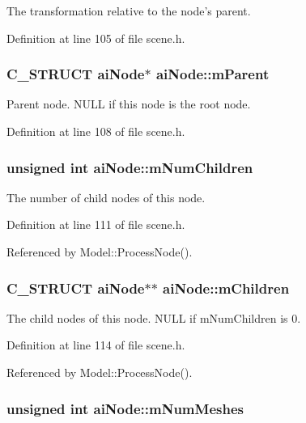 The transformation relative to the node's parent. 

Definition at line 105 of file scene.h.\hypertarget{structai_node_a6896b42c78e784db85d822a4c8dd404}{
\subsubsection[mParent]{\setlength{\rightskip}{0pt plus 5cm}C\_\-STRUCT {\bf aiNode}$\ast$ {\bf aiNode::mParent}}}
\label{structai_node_a6896b42c78e784db85d822a4c8dd404}


Parent node. NULL if this node is the root node. 

Definition at line 108 of file scene.h.\hypertarget{structai_node_f5030494b156ec54632e6182a6e386ca}{
\subsubsection[mNumChildren]{\setlength{\rightskip}{0pt plus 5cm}unsigned int {\bf aiNode::mNumChildren}}}
\label{structai_node_f5030494b156ec54632e6182a6e386ca}


The number of child nodes of this node. 

Definition at line 111 of file scene.h.

Referenced by Model::ProcessNode().\hypertarget{structai_node_c700679f0d4971f124e8444f68057291}{
\subsubsection[mChildren]{\setlength{\rightskip}{0pt plus 5cm}C\_\-STRUCT {\bf aiNode}$\ast$$\ast$ {\bf aiNode::mChildren}}}
\label{structai_node_c700679f0d4971f124e8444f68057291}


The child nodes of this node. NULL if mNumChildren is 0. 

Definition at line 114 of file scene.h.

Referenced by Model::ProcessNode().\hypertarget{structai_node_7a411079096f86d1e96b6368d237d897}{
\subsubsection[mNumMeshes]{\setlength{\rightskip}{0pt plus 5cm}unsigned int {\bf aiNode::mNumMeshes}}}
\label{structai_node_7a411079096f86d1e96b6368d237d897}


